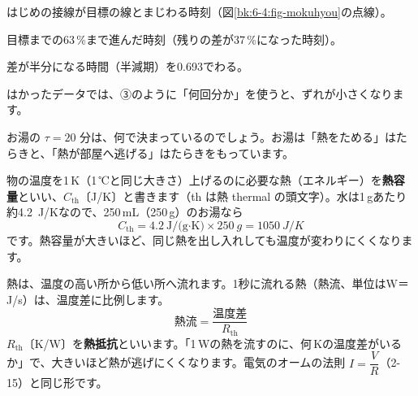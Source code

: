 \begin{enumerate}[label={\bkcircled[\bkTF]{\arabic*}}, leftmargin=2.4\zw, itemsep=1pt, topsep=2pt]
\item はじめの接線が目標の線とまじわる時刻（図\ref{bk:6-4:fig-mokuhyou}の点線）。
\item 目標までの63\,\%まで進んだ時刻（残りの差が37\,\%になった時刻）。
\item 差が半分になる時間（半減期）を0.693でわる。
\end{enumerate}
はかったデータでは、③のように「何回分か」を使うと、ずれが小さくなります。


\leavevmode\label{bk:6-4:netsu}お湯の $\tau=20$ 分は、何で決まっているのでしょう。お湯は「熱をためる」はたらきと、「熱が部屋へ逃げる」はたらきをもっています。

物の温度を1\,K（1\,℃と同じ大きさ）上げるのに必要な熱（エネルギー）を\textbf{熱容量}といい、$C_{\mathrm{th}}$〔J/K〕と書きます（th は熱 thermal の頭文字）。水は1\,gあたり約\qty{4.2}{J/K}なので、250\,mL（250\,g）のお湯なら
\[ C_{\mathrm{th}}=4.2\ \text{J/(g·K)}\times\qty{250}{g}=\qty{1050}{J/K} \]
です。熱容量が大きいほど、同じ熱を出し入れしても温度が変わりにくくなります。

熱は、温度の高い所から低い所へ流れます。1秒に流れる熱（熱流、単位はW＝J/s）は、温度差に比例します。
\[ \text{熱流}=\frac{\text{温度差}}{R_{\mathrm{th}}} \]
$R_{\mathrm{th}}$〔K/W〕を\textbf{熱抵抗}といいます。「1\,Wの熱を流すのに、何\,Kの温度差がいるか」で、大きいほど熱が逃げにくくなります。電気のオームの法則 $I=\dfrac{V}{R}$（2-15）と同じ形です。


